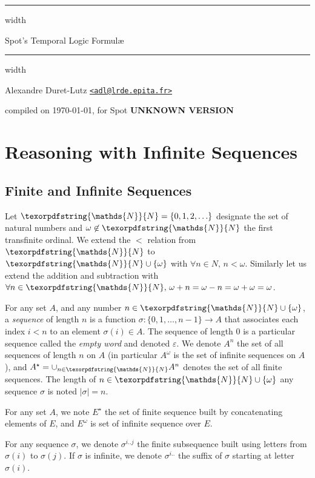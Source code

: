 \documentclass[a4paper,twoside,10pt,DIV=12,draft]{scrreprt}
\newcommand{\N}{\texorpdfstring{\ensuremath{\mathds{N}}}{N}}
\newcommand{\0}{\texttt{0}}
\newcommand{\1}{\texttt{1}}
\def\SpotVersion{\textbf{UNKNOWN VERSION}}
\def\manualtitle{Spot's Temporal Logic Formul\ae}
\begin{document}
\vspace*{50pt}
\vskip4pt \hrule height 4pt width \hsize \vskip4pt
\begin{center}
  \huge \manualtitle
\end{center}
\vspace*{-1.5ex}
\vskip4pt \hrule height 4pt width \hsize \vskip4pt

\hfill Alexandre Duret-Lutz
\href{mailto:adl@lrde.epita.fr}{\nolinkurl{<adl@lrde.epita.fr>}}

\hfill compiled on \today, for Spot \SpotVersion

\vfill

\setcounter{tocdepth}{2}
\makeatletter
{}
\makeatother

\vfill

\chapter{Reasoning with Infinite Sequences}

\section{Finite and Infinite Sequences}

Let $\N=\{0,1,2,\ldots\}$ designate the set of natural numbers and
$\omega\not\in\N$ the first transfinite ordinal.  We extend the $<$
relation from $\N$ to $\N\cup\{\omega\}$ with $\forall n\in N,\,
n<\omega$.  Similarly let us extend the addition and subtraction with
$\forall n\in\N,\,\omega+n = \omega-n = \omega+\omega = \omega$.

For any set $A$, and any number $n\in\N\cup\{\omega\}$, a
\textit{sequence} of length $n$ is a function $\sigma:
\{0,1,\ldots,n-1\}\to A$ that associates each index $i<n$ to an
element $\sigma(i)\in A$.  The sequence of length $0$ is a particular
sequence called the \textit{empty word} and denoted $\varepsilon$.  We
denote $A^n$ the set of all sequences of length $n$ on $A$ (in
particular $A^\omega$ is the set of infinite sequences on $A$), and
$A^\star=\cup_{n\in\N}A^n$ denotes the set of all finite sequences.
The length of $n\in\N\cup\{\omega\}$ any sequence $\sigma$ is noted
$|\sigma|=n$.

For any set $A$, we note $E^\star$ the set of finite sequence
built by concatenating elements of $E$, and $E^\omega$ is set of
infinite sequence over $E$.

For any sequence $\sigma$, we denote $\sigma^{i..j}$ the finite
subsequence built using letters from $\sigma(i)$ to $\sigma(j)$.  If
$\sigma$ is infinite, we denote $\sigma^{i..}$ the suffix of $\sigma$
starting at letter $\sigma(i)$.
\end{document}
